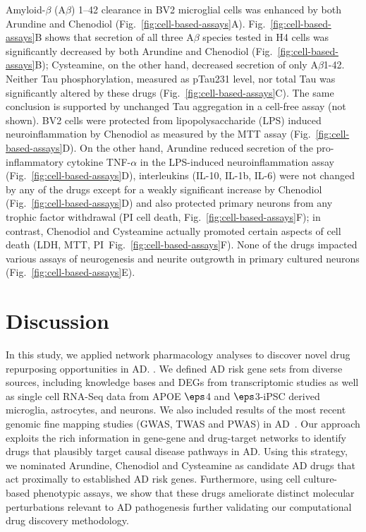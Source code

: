 \documentclass[letterpaper]{article}
\begin{document}
Amyloid-$\beta$ (A$\beta$) 1--42 clearance in BV2 microglial cells was
enhanced by both Arundine and Chenodiol (Fig.~\ref{fig:cell-based-assays}A).
Fig.~\ref{fig:cell-based-assays}B shows that secretion of all three A$\beta$
species tested in H4 cells was significantly decreased by both Arundine and
Chenodiol (Fig.~\ref{fig:cell-based-assays}B); Cysteamine, on the other hand,
decreased secretion of only A$\beta$1-42.  Neither Tau phosphorylation,
measured as pTau231 level, nor total Tau was significantly altered by these
drugs (Fig.~\ref{fig:cell-based-assays}C).  The same conclusion is supported
by unchanged Tau aggregation in a cell-free assay (not shown). BV2 cells were
protected from lipopolysaccharide (LPS) induced neuroinflammation by Chenodiol
as measured by the MTT assay (Fig.~\ref{fig:cell-based-assays}D).  On the
other hand, Arundine reduced secretion of the pro-inflammatory cytokine
TNF-$\alpha$ in the LPS-induced neuroinflammation assay
(Fig.~\ref{fig:cell-based-assays}D), interleukins (IL-10, IL-1b, IL-6) were
not changed by any of the drugs except for a weakly significant increase by
Chenodiol (Fig.~\ref{fig:cell-based-assays}D) and also protected primary
neurons from any trophic factor withdrawal (PI cell death,
Fig.~\ref{fig:cell-based-assays}F); in contrast, Chenodiol and Cysteamine
actually promoted certain aspects of cell death (LDH, MTT,
PI~Fig.~\ref{fig:cell-based-assays}F).  None of the drugs impacted various
assays of neurogenesis and neurite outgrowth in primary cultured neurons
(Fig.~\ref{fig:cell-based-assays}E).

\section{Discussion}

In this study, we applied network pharmacology analyses to discover novel drug
repurposing opportunities in AD. .  We defined AD risk gene sets from diverse
sources, including knowledge bases and DEGs from transcriptomic studies as
well as single cell RNA-Seq data from APOE $\eps$4 and $\eps$3-iPSC derived microglia,
astrocytes, and neurons. We also included results of the most recent genomic
fine mapping studies (GWAS, TWAS and PWAS) in AD~\citep{Zhu2018,Lau2020}. Our
approach exploits the rich information in gene-gene and drug-target networks
to identify drugs that plausibly target causal disease pathways in AD. Using
this strategy, we nominated Arundine, Chenodiol and Cysteamine as candidate AD
drugs that act proximally to established AD risk genes. Furthermore, using
cell culture-based phenotypic assays, we show that these drugs ameliorate
distinct molecular perturbations relevant to AD pathogenesis further
validating our computational drug discovery methodology.
\end{document}
